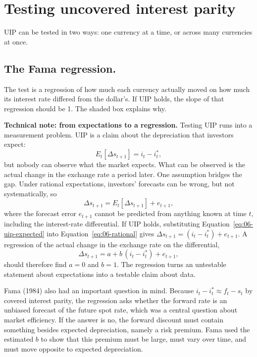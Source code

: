 \section{Testing uncovered interest parity}
\label{sec:06-how}

UIP can be tested in two ways: one currency at a time, or across many currencies at once.


\subsection{The Fama regression.} 

The test is a regression of how much each currency actually moved on how much its interest rate differed from the dollar's. If UIP holds, the slope of that regression should be 1. The shaded box explains why.

\begin{technote}
\textbf{Technical note: from expectations to a regression.} Testing UIP runs into a measurement problem. UIP is a claim about the depreciation that investors expect:
\begin{equation}
  E_t[\Delta s_{t+1}] = i_t - i^*_t,
  \label{eq:06-uip-expected}
\end{equation}
but nobody can observe what the market expects. What can be observed is the actual change in the exchange rate a period later. One assumption bridges the gap. Under rational expectations, investors' forecasts can be wrong, but not systematically, so
\begin{equation}
  \Delta s_{t+1} = E_t[\Delta s_{t+1}] + e_{t+1},
  \label{eq:06-rational}
\end{equation}
where the forecast error $e_{t+1}$ cannot be predicted from anything known at time $t$, including the interest-rate differential. If UIP holds, substituting Equation~\eqref{eq:06-uip-expected} into Equation~\eqref{eq:06-rational} gives $\Delta s_{t+1} = (i_t - i^*_t) + e_{t+1}$. A regression of the actual change in the exchange rate on the differential,
\begin{equation}
  \Delta s_{t+1} = a + b\,(i_t - i^*_t) + e_{t+1},
  \label{eq:06-fama}
\end{equation}
should therefore find $a = 0$ and $b = 1$. The regression turns an untestable statement about expectations into a testable claim about data.
\end{technote}

Fama (1984) also had an important question in mind. Because $i_t - i^*_t \approx f_t - s_t$ by covered interest parity, the regression asks whether the forward rate is an unbiased forecast of the future spot rate, which was a central question about market efficiency. If the answer is no, the forward discount must contain something besides expected depreciation, namely a risk premium. Fama used the estimated $b$ to show that this premium must be large, must vary over time, and must move opposite to expected depreciation.


